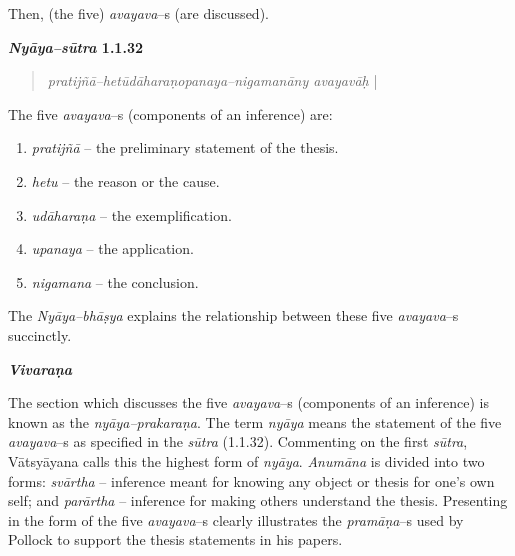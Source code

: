 Then, (the five) \textit{avayava}–s (are discussed).

\textbf{\textit{Nyāya–sūtra} 1.1.32}

\begin{verse}
\textit{pratijñā–hetūdāharaṇopanaya–nigamanāny avayavāḥ} |
\end{verse}

The five \textit{avayava}–s (components of an inference) are:

\begin{enumerate}
\item \textit{pratijñā} – the preliminary statement of the thesis.

 \item \textit{hetu} – the reason or the cause.

 \item \textit{udāharaṇa} – the exemplification.

 \item \textit{upanaya} – the application.

 \item \textit{nigamana} – the conclusion.

\end{enumerate}

The \textit{Nyāya–bhāṣya} explains the relationship between these five \textit{avayava}–s succinctly.

\textit{\textbf{Vivaraṇa}}

The section which discusses the five \textit{avayava}–s (components of an inference) is known as the \textit{nyāya–prakaraṇa}. The term \textit{nyāya} means the statement of the five \textit{avayava}–s as specified in the \textit{sūtra} (1.1.32). Commenting on the first \textit{sūtra}, Vātsyāyana calls this the highest form of \textit{nyāya}. \textit{Anumāna} is divided into two forms: \textit{svārtha} – inference meant for knowing any object or thesis for one’s own self; and \textit{parārtha} – inference for making others understand the thesis. Presenting in the form of the five \textit{avayava}–s clearly illustrates the \textit{pramāṇa}–s used by Pollock to support the thesis statements in his papers.

